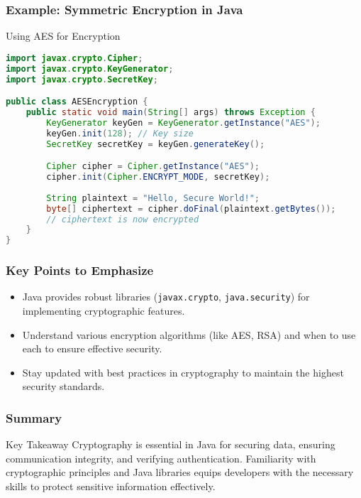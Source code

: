 \documentclass{beamer}
\begin{document}
\begin{frame}[fragile]
    \frametitle{Example: Symmetric Encryption in Java}
    \begin{block}{Using AES for Encryption}
        \begin{lstlisting}[language=Java]
import javax.crypto.Cipher;
import javax.crypto.KeyGenerator;
import javax.crypto.SecretKey;

public class AESEncryption {
    public static void main(String[] args) throws Exception {
        KeyGenerator keyGen = KeyGenerator.getInstance("AES");
        keyGen.init(128); // Key size
        SecretKey secretKey = keyGen.generateKey();

        Cipher cipher = Cipher.getInstance("AES");
        cipher.init(Cipher.ENCRYPT_MODE, secretKey);
        
        String plaintext = "Hello, Secure World!";
        byte[] ciphertext = cipher.doFinal(plaintext.getBytes());
        // ciphertext is now encrypted
    }
}
        \end{lstlisting}
    \end{block}
\end{frame}

\begin{frame}[fragile]
    \frametitle{Key Points to Emphasize}
    \begin{itemize}
        \item Java provides robust libraries (\texttt{javax.crypto}, \texttt{java.security}) for implementing cryptographic features.
        \item Understand various encryption algorithms (like AES, RSA) and when to use each to ensure effective security.
        \item Stay updated with best practices in cryptography to maintain the highest security standards.
    \end{itemize}
\end{frame}

\begin{frame}[fragile]
    \frametitle{Summary}
    \begin{block}{Key Takeaway}
        Cryptography is essential in Java for securing data, ensuring communication integrity, and verifying authentication. 
        Familiarity with cryptographic principles and Java libraries equips developers with the necessary skills to protect sensitive information effectively.
    \end{block}
\end{frame}
\end{document}
